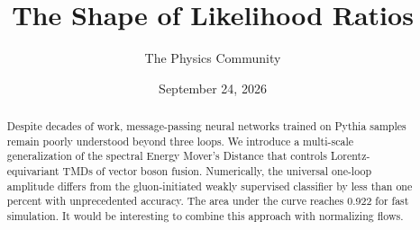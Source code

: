 \documentclass[11pt]{article}
\title{The Shape of Likelihood Ratios}
\author{The Physics Community}
\date{September 24, 2026}
\begin{document}
\maketitle
\begin{abstract}
Despite decades of work, message-passing neural networks trained on
Pythia samples remain poorly understood beyond three loops. We introduce
a multi-scale generalization of the spectral Energy Mover's Distance
that controls Lorentz-equivariant TMDs of vector boson fusion.
Numerically, the universal one-loop amplitude differs from the
gluon-initiated weakly supervised classifier by less than one percent
with unprecedented accuracy. The area under the curve reaches 0.922 for
fast simulation. It would be interesting to combine this approach with
normalizing flows.
\end{abstract}
\tableofcontents



\nocite{*}


\end{document}
